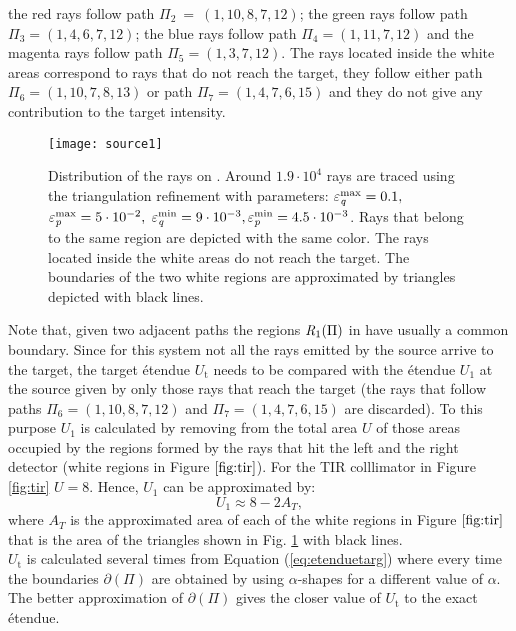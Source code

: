    the red rays follow path $\Pi_2 ~= ~(1, 10, 8, 7, 12)$; the green rays follow path $\Pi_3 = (1, 4, 6, 7, 12)$;
   the blue rays follow path $\Pi_4= (1, 11, 7, 12)$ and the magenta rays follow path $\Pi_5= (1, 3, 7, 12)$. The rays located inside the white areas correspond to rays that do not reach the target, they follow either path $\Pi_6 = (1, 10, 7, 8, 13)$ or path $\Pi_7 = (1,4,7,6,15)$ and they do not give any contribution to the target intensity.
\begin{figure}[h]
  \begin{center}
  \texttt{[image: source1]}
  \end{center}
  \caption{Distribution of the rays on . Around $1.9 \cdot 10^4$ rays are traced using the triangulation refinement with parameters:
  $\varepsilon_{\textit{q}}^\textrm{max} = 0.1 ,$ $ \varepsilon_{\textit{p}}^\textrm{max} = 5\cdot 10^{-2}, $ $\varepsilon_{\textit{q}}^\textrm{min} = 9\cdot 10^{-3}, \varepsilon_{\textit{p}}^\textrm{min} = 4.5 \cdot 10^{-3}$. Rays that belong to the same region are depicted with the same color. The rays located inside the white areas do not reach the target. The boundaries of the two white regions are approximated by triangles depicted with black lines.}
  \label{fig:sourcePS}
\end{figure}
Note that, given two adjacent paths the regions $\mbox{$\emph{R}_{\textit{$1$}}$}(\Pi)$ in  have usually a common boundary. 
Since for this system not all the rays emitted by the source arrive to the target, the target \'{e}tendue $U_{\textrm{t}}$ needs to be compared with the \'{e}tendue $U_1$ at the source given by only those rays that reach the target (the rays that follow paths $\Pi_6=(1,10,8,7,12)$ and 
$\Pi_7 = (1,4,7,6,15)$ are discarded). To this purpose $U_1$ is calculated by removing from the total area $U$ of  those areas occupied by the regions formed by the rays that hit the left and the right detector (white regions in Figure $\ref{fig:tir}$).  For the TIR colllimator in Figure \ref{fig:tir} $U = 8$. Hence, $U_1$ can be approximated by:
 \begin{equation}\label{eq:Usource}
 U_{1}\approx 8-2A_{T},
 \end{equation}
 where $A_{T}$ is the approximated area of each of the white regions in Figure $\ref{fig:tir}$ that is the area of the triangles shown in Fig. \ref{fig:sourcePS} with black lines.\\ \indent  $U_{\textrm{t}}$ is calculated several times from Equation (\ref{eq:etenduetarg}) where every time the boundaries $\partial$$(\Pi)$ are obtained by using $\alpha$-shapes for a different value of $\alpha$. The better approximation of $\partial$$(\Pi)$ gives the closer value of $U_{\textrm{t}}$ to the exact \'{e}tendue. 
